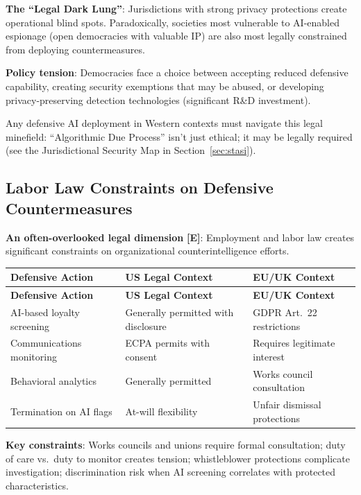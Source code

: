 \documentclass[11pt,letterpaper]{article}
\begin{document}
\textbf{The ``Legal Dark Lung''}: Jurisdictions with strong privacy protections create operational blind spots. Paradoxically, societies most vulnerable to AI-enabled espionage (open democracies with valuable IP) are also most legally constrained from deploying countermeasures.

\textbf{Policy tension}: Democracies face a choice between accepting reduced defensive capability, creating security exemptions that may be abused, or developing privacy-preserving detection technologies (significant R\&D investment).

\begin{recbox}[Recommendation]
Any defensive AI deployment in Western contexts must navigate this legal minefield: ``Algorithmic Due Process'' isn't just ethical; it may be legally required (see the Jurisdictional Security Map in Section~\ref{sec:stasi}).
\end{recbox}

\subsection{Labor Law Constraints on Defensive Countermeasures}

\textbf{An often-overlooked legal dimension} \textbf{[E]}: Employment and labor law creates significant constraints on organizational counterintelligence efforts.

{\small
\begin{longtable}{L{3.5cm}L{4cm}L{4cm}}
\toprule
\textbf{Defensive Action} & \textbf{US Legal Context} & \textbf{EU/UK Context} \\
\midrule
\endfirsthead
\toprule
\textbf{Defensive Action} & \textbf{US Legal Context} & \textbf{EU/UK Context} \\
\midrule
\endhead
AI-based loyalty screening & Generally permitted with disclosure & GDPR Art.\ 22 restrictions \\*
Communications monitoring & ECPA permits with consent & Requires legitimate interest \\
Behavioral analytics & Generally permitted & Works council consultation \\*
Termination on AI flags & At-will flexibility & Unfair dismissal protections \\
\bottomrule
\end{longtable}}

\textbf{Key constraints}: Works councils and unions require formal consultation; duty of care vs.\ duty to monitor creates tension; whistleblower protections complicate investigation; discrimination risk when AI screening correlates with protected characteristics.
\end{document}
